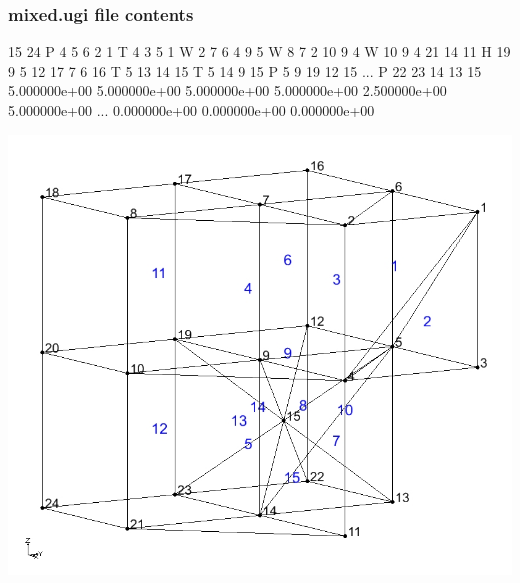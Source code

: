 \documentclass{beamer}
\begin{document}
\begin{frame}\frametitle{mixed.ugi file contents}

\begin{minipage}[t]{0.48\linewidth}
  \begin{semiverbatim}
15 24
P 4 5 6 2 1
T 4 3 5 1
W 2 7 6 4 9 5
W 8 7 2 10 9 4
W 10 9 4 21 14 11
H 19 9 5 12 17 7 6 16
T 5 13 14 15
T 5 14 9 15
P 5 9 19 12 15
...
P 22 23 14 13 15
5.000000e+00 5.000000e+00 5.000000e+00
5.000000e+00 2.500000e+00 5.000000e+00
...
0.000000e+00 0.000000e+00 0.000000e+00
  \end{semiverbatim}
\end{minipage}
\hfill
\begin{minipage}[t]{0.48\linewidth}
  \vspace{-0.5in}
  \hspace{-.5in}
  \includegraphics[width=1.4\linewidth]{./mixed}
\end{minipage}

\end{frame}
\end{document}
